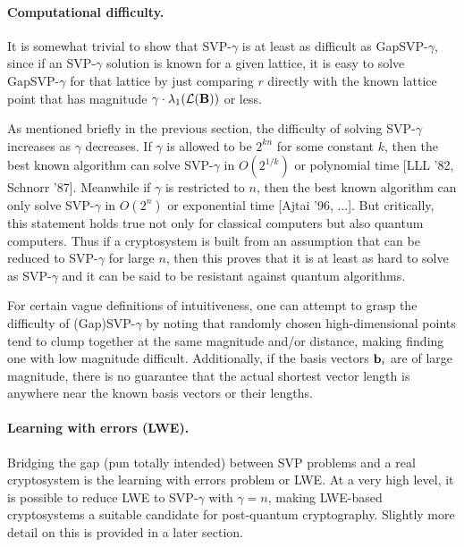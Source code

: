 \paragraph{Computational difficulty.}
It is somewhat trivial to show that SVP-$\gamma$ is at least as difficult as 
GapSVP-$\gamma$, since if an SVP-$\gamma$ solution is known for a given lattice, 
it is easy to solve GapSVP-$\gamma$ for that lattice by just comparing $r$ 
directly with the known lattice point that has magnitude $\gamma \cdot 
\lambda_1({\cal L}(\textbf{B}))$ or less.

As mentioned briefly in the previous section, the difficulty of solving 
SVP-$\gamma$ increases as $\gamma$ decreases. If $\gamma$ is allowed to be 
$2^{kn}$ for some constant $k$, then the best known algorithm can solve 
SVP-$\gamma$ in $O(2^{1/k})$ or polynomial time [LLL '82, Schnorr '87]. 
Meanwhile if $\gamma$ is restricted to $n$, then the best known algorithm can 
only solve SVP-$\gamma$ in $O(2^n)$ or exponential time [Ajtai '96, ...]. But 
critically, this statement holds true not only for classical computers but also 
quantum computers. Thus if a cryptosystem is built from an assumption that can 
be reduced to SVP-$\gamma$ for large $n$, then this proves that it is at least 
as hard to solve as SVP-$\gamma$ and it can be said to be resistant against 
quantum algorithms.

For certain vague definitions of intuitiveness, one can attempt to grasp the 
difficulty of (Gap)SVP-$\gamma$ by noting that randomly chosen high-dimensional 
points tend to clump together at the same magnitude and/or distance, making 
finding one with low magnitude difficult. Additionally, if the basis vectors 
${{\bf b}}_i$ are of large magnitude, there is no guarantee that the actual shortest 
vector length is anywhere near the known basis vectors or their lengths.

\paragraph{Learning with errors (LWE).}
Bridging the gap (pun totally intended) between SVP problems and a real 
cryptosystem is the learning with errors problem or LWE. At a very high level, 
it is possible to reduce LWE to SVP-$\gamma$ with $\gamma = n$, making LWE-based 
cryptosystems a suitable candidate for post-quantum cryptography. Slightly more 
detail on this is provided in a later section.

